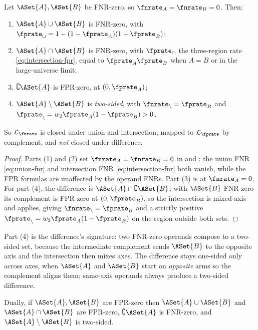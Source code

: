 \begin{proposition}
\label{prop:fnr-zero-closure}
Let $\ASet{A}, \ASet{B}$ be FNR-zero, so $\fnrate_A = \fnrate_B = 0$. Then:
\begin{enumerate}
  \item $\ASet{A} \cup \ASet{B}$ is FNR-zero, with $\fprate_\cup = 1 -
    (1 - \fprate_A)(1 - \fprate_B)$;
  \item $\ASet{A} \cap \ASet{B}$ is FNR-zero, with $\fprate_\cap$ the
    three-region rate \eqref{eq:intersection-fpr}, equal to $\fprate_A
    \fprate_B$ when $A = B$ or in the large-universe limit;
  \item $\complement \ASet{A}$ is FPR-zero, at $(0, \fprate_A)$;
  \item $\ASet{A} \setminus \ASet{B}$ is \emph{two-sided}, with
    $\fnrate_\setminus = \fprate_B$ and $\fprate_\setminus = w_2 \fprate_A
    (1 - \fprate_B) > 0$.
\end{enumerate}
So $\mathcal{L}_{\fnrate}$ is closed under union and intersection, mapped to
$\mathcal{L}_{\fprate}$ by complement, and \emph{not} closed under difference.
\end{proposition}

\begin{proof}
Parts (1) and (2) set $\fnrate_A = \fnrate_B = 0$ in
 and : the union FNR
\eqref{eq:union-fnr} and intersection FNR \eqref{eq:intersection-fnr} both
vanish, while the FPR formulas are unaffected by the operand FNRs. Part (3) is
 at $\fnrate_A = 0$. For part (4), the difference
is $\ASet{A} \cap \complement \ASet{B}$; with $\ASet{B}$ FNR-zero its
complement is FPR-zero at $(0, \fprate_B)$, so the intersection is mixed-axis
and  applies, giving $\fnrate_\setminus =
\fprate_B$ and a strictly positive $\fprate_\setminus = w_2 \fprate_A(1 -
\fprate_B)$ on the region outside both sets.
\end{proof}

Part (4) is the difference's signature: two FNR-zero operands compose to a
two-sided set, because the intermediate complement sends $\ASet{B}$ to the
opposite axis and the intersection then mixes axes. The difference stays
one-sided only across axes, when $\ASet{A}$ and $\ASet{B}$ start on
\emph{opposite} arms so the complement aligns them; same-axis operands always
produce a two-sided difference.

\begin{proposition}
\label{prop:fpr-zero-closure}
Dually, if $\ASet{A}, \ASet{B}$ are FPR-zero then $\ASet{A} \cup \ASet{B}$ and
$\ASet{A} \cap \ASet{B}$ are FPR-zero, $\complement \ASet{A}$ is FNR-zero, and
$\ASet{A} \setminus \ASet{B}$ is two-sided.
\end{proposition}


